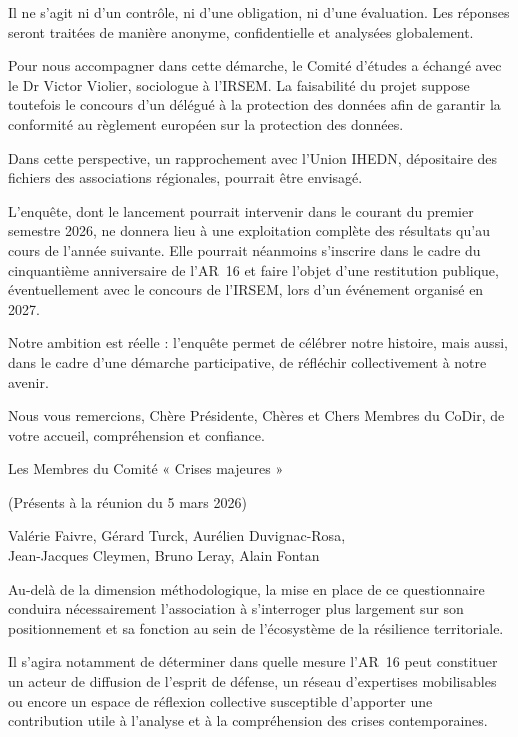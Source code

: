 \documentclass[12pt,a4paper]{article}
\begin{document}
\begin{tcolorbox}[
breakable,
colback=gray!5,
colframe=black,
boxrule=0.5pt,
arc=3mm
]
Il ne s'agit ni d'un contrôle, ni d'une obligation, ni d'une évaluation. Les réponses seront traitées de manière anonyme, confidentielle et analysées globalement.

Pour nous accompagner dans cette démarche, le Comité d'études a échangé avec le Dr Victor Violier, sociologue à l'IRSEM. La faisabilité du projet suppose toutefois le concours d'un délégué à la protection des données afin de garantir la conformité au règlement européen sur la protection des données.

Dans cette perspective, un rapprochement avec l'Union IHEDN, dépositaire des fichiers des associations régionales, pourrait être envisagé.

L'enquête, dont le lancement pourrait intervenir dans le courant du premier semestre 2026, ne donnera lieu à une exploitation complète des résultats qu'au cours de l'année suivante. Elle pourrait néanmoins s'inscrire dans le cadre du cinquantième anniversaire de l'AR~16 et faire l'objet d'une restitution publique, éventuellement avec le concours de l'IRSEM, lors d'un événement organisé en 2027.

Notre ambition est réelle : l'enquête permet de célébrer notre histoire, mais aussi, dans le cadre d'une démarche participative, de réfléchir collectivement à notre avenir.

Nous vous remercions, Chère Présidente, Chères et Chers Membres du CoDir, de votre accueil, compréhension et confiance.

\begin{flushright}
Les Membres du Comité « Crises majeures »

(Présents à la réunion du 5 mars 2026)

Valérie Faivre, Gérard Turck, Aurélien Duvignac-Rosa,\\
Jean-Jacques Cleymen, Bruno Leray, Alain Fontan
\end{flushright}

\end{tcolorbox}

Au-delà de la dimension méthodologique, la mise en place de ce questionnaire
conduira nécessairement l'association à s'interroger plus largement sur son
positionnement et sa fonction au sein de l'écosystème de la résilience
territoriale.

Il s'agira notamment de déterminer dans quelle mesure l'AR~16 peut constituer
un acteur de diffusion de l'esprit de défense, un réseau d'expertises
mobilisables ou encore un espace de réflexion collective susceptible
d'apporter une contribution utile à l'analyse et à la compréhension des
crises contemporaines.
\end{document}
